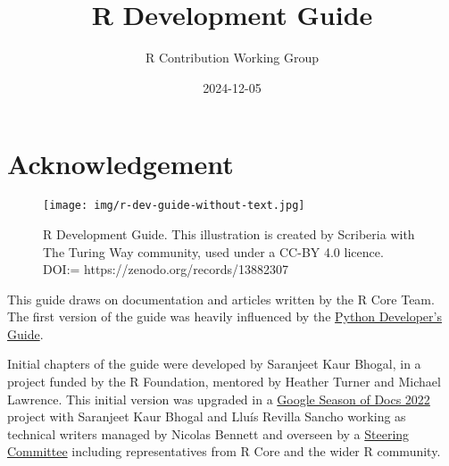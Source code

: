 \documentclass[
  letterpaper,
  DIV=11,
  numbers=noendperiod]{scrreprt}
\title{R Development Guide}
\author{R Contribution Working Group}
\date{2024-12-05}
\let\oldmaketitle\maketitle
\renewcommand*\contentsname{Table of contents}
\newcommand\contentsname{Table of contents}
\begin{document}
\maketitle


\newpage

\let\maketitle\oldmaketitle
\maketitle

\renewcommand*\contentsname{Table of contents}
{
\hypersetup{linkcolor=}
\setcounter{tocdepth}{2}
\tableofcontents
}


\chapter*{Acknowledgement}\label{acknowledgement}


\begin{figure}[H]

{\centering \texttt{[image: img/r-dev-guide-without-text.jpg]}

}

\caption{R Development Guide. This illustration is created by Scriberia
with The Turing Way community, used under a CC-BY 4.0 licence. DOI:=
https://zenodo.org/records/13882307}

\end{figure}%

This guide draws on documentation and articles written by the R Core
Team. The first version of the guide was heavily influenced by the
\href{https://devguide.python.org/}{Python Developer's Guide}.

Initial chapters of the guide were developed by Saranjeet Kaur Bhogal,
in a project funded by the R Foundation, mentored by Heather Turner and
Michael Lawrence. This initial version was upgraded in a
\href{https://github.com/rstats-gsod/gsod2022/wiki/GSOD-2022-Proposal}{Google
Season of Docs 2022} project with Saranjeet Kaur Bhogal and Lluís
Revilla Sancho working as technical writers managed by Nicolas Bennett
and overseen by a
\href{https://github.com/rstats-gsod/gsod2022/wiki/GSOD-2022-Proposal\#steering-committee}{Steering
Committee} including representatives from R Core and the wider R
community.
\end{document}
